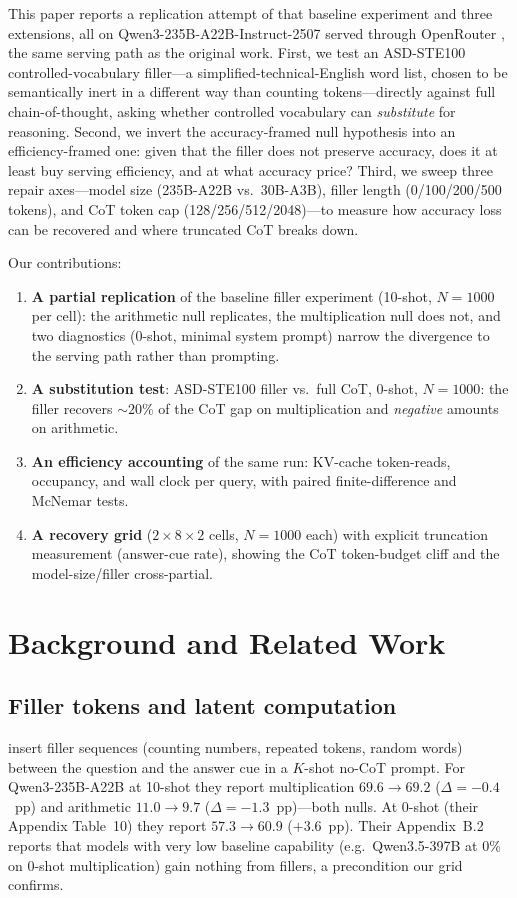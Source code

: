 \documentclass[11pt,a4paper]{article}
\begin{document}
This paper reports a replication attempt of that baseline experiment and three
extensions, all on Qwen3-235B-A22B-Instruct-2507 served through OpenRouter
\citep{openrouter2026}, the same serving path as the original work. First, we
test an ASD-STE100 controlled-vocabulary filler---a simplified-technical-English
word list, chosen to be semantically inert in a different way than counting
tokens---directly against full chain-of-thought, asking whether controlled
vocabulary can \emph{substitute} for reasoning. Second, we invert the
accuracy-framed null hypothesis into an efficiency-framed one: given that the
filler does not preserve accuracy, does it at least buy serving efficiency, and
at what accuracy price? Third, we sweep three repair axes---model size (235B-A22B
vs.\ 30B-A3B), filler length (0/100/200/500 tokens), and CoT token cap
(128/256/512/2048)---to measure how accuracy loss can be recovered and where
truncated CoT breaks down.

Our contributions:
\begin{enumerate}
    \item \textbf{A partial replication} of the baseline filler experiment
    (10-shot, $N{=}1000$ per cell): the arithmetic null replicates, the
    multiplication null does not, and two diagnostics (0-shot, minimal system
    prompt) narrow the divergence to the serving path rather than prompting.
    \item \textbf{A substitution test}: ASD-STE100 filler vs.\ full CoT,
    0-shot, $N{=}1000$: the filler recovers ${\sim}20\%$ of the CoT gap on
    multiplication and \emph{negative} amounts on arithmetic.
    \item \textbf{An efficiency accounting} of the same run: KV-cache
    token-reads, occupancy, and wall clock per query, with paired
    finite-difference and McNemar tests.
    \item \textbf{A recovery grid} ($2 \times 8 \times 2$ cells, $N{=}1000$
    each) with explicit truncation measurement (answer-cue rate), showing the
    CoT token-budget cliff and the model-size/filler cross-partial.
\end{enumerate}

\section{Background and Related Work}
\label{sec:related}

\subsection{Filler tokens and latent computation}
\citet{baherwani2026not} insert filler sequences (counting numbers, repeated
tokens, random words) between the question and the answer cue in a $K$-shot
no-CoT prompt. For Qwen3-235B-A22B at 10-shot they report multiplication
$69.6 \to 69.2$ ($\Delta = -0.4$~pp) and arithmetic $11.0 \to 9.7$
($\Delta = -1.3$~pp)---both nulls. At 0-shot (their Appendix Table~10) they
report $57.3 \to 60.9$ ($+3.6$~pp). Their Appendix~B.2 reports that models with
very low baseline capability (e.g.\ Qwen3.5-397B at 0\% on 0-shot
multiplication) gain nothing from fillers, a precondition our grid confirms.
\end{document}
